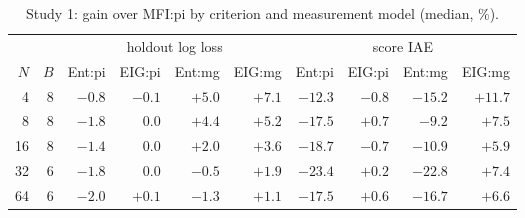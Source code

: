 \begin{table}[htbp]
\centering\footnotesize
\caption{Study 1: gain over MFI:pi by criterion and measurement model (median, \%).}
\label{tab:factorial}
\setlength{\tabcolsep}{3.5pt}
\begin{tabular}{@{}rrrrrrrrrr@{}}
\toprule
 & & \multicolumn{4}{c}{holdout log loss} & \multicolumn{4}{c}{score IAE} \\
\cmidrule(lr){3-6}\cmidrule(lr){7-10}
$N$ & $B$ & Ent:pi & EIG:pi & Ent:mg & EIG:mg & Ent:pi & EIG:pi & Ent:mg & EIG:mg \\
\midrule
4 & 8 & $-0.8$ & $-0.1$ & $+5.0$ & $+7.1$ & $-12.3$ & $-0.8$ & $-15.2$ & $+11.7$ \\
8 & 8 & $-1.8$ & $0.0$ & $+4.4$ & $+5.2$ & $-17.5$ & $+0.7$ & $-9.2$ & $+7.5$ \\
16 & 8 & $-1.4$ & $0.0$ & $+2.0$ & $+3.6$ & $-18.7$ & $-0.7$ & $-10.9$ & $+5.9$ \\
32 & 6 & $-1.8$ & $0.0$ & $-0.5$ & $+1.9$ & $-23.4$ & $+0.2$ & $-22.8$ & $+7.4$ \\
64 & 6 & $-2.0$ & $+0.1$ & $-1.3$ & $+1.1$ & $-17.5$ & $+0.6$ & $-16.7$ & $+6.6$ \\
\bottomrule
\end{tabular}
\end{table}
